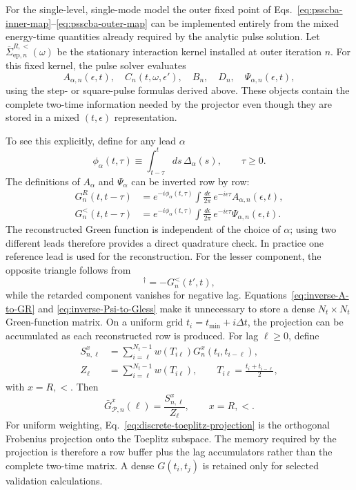 \documentclass[
 reprint,
 superscriptaddress,
 amsmath,amssymb,
 aps,prb,
 longbibliography,
 floatfix
]{revtex4-2}
\newcommand{\ep}{\mathrm{ep}}
\newcommand{\barSigma}{\overline{\Sigma}}
\begin{document}
For the single-level, single-mode model the outer fixed point of Eqs.~\eqref{eq:psscba-inner-map}--\eqref{eq:psscba-outer-map} can be implemented entirely from the mixed energy-time quantities already required by the analytic pulse solution. Let
\(\barSigma_{\ep,n}^{R,<}(\omega)\)
be the stationary interaction kernel installed at outer iteration \(n\). For this fixed kernel, the pulse solver evaluates
\begin{equation*}
A_{\alpha,n}(\epsilon,t),
\quad
C_n(t,\omega,\epsilon'),
\quad
B_n,
\quad
D_n,
\quad
\Psi_{\alpha,n}(\epsilon,t),
\end{equation*}
using the step- or square-pulse formulas derived above. These objects contain the complete two-time information needed by the projector even though they are stored in a mixed \((t,\epsilon)\) representation.

To see this explicitly, define for any lead \(\alpha\)
\begin{equation*}
\phi_\alpha(t,\tau)
\equiv
\int_{t-\tau}^{t}ds\,\Delta_\alpha(s),
\qquad \tau\ge0.
\end{equation*}
The definitions of \(A_\alpha\) and \(\Psi_\alpha\) can be inverted row by row:
\begin{align}
G_n^R(t,t-\tau)
&=
e^{-i\phi_\alpha(t,\tau)}
\int\frac{d\epsilon}{2\pi}\,
e^{-i\epsilon\tau}
A_{\alpha,n}(\epsilon,t),
\label{eq:inverse-A-to-GR}
\\
G_n^<(t,t-\tau)
&=
e^{-i\phi_\alpha(t,\tau)}
\int\frac{d\epsilon}{2\pi}\,
e^{-i\epsilon\tau}
\Psi_{\alpha,n}(\epsilon,t).
\label{eq:inverse-Psi-to-Gless}
\end{align}
The reconstructed Green function is independent of the choice of \(\alpha\); using two different leads therefore provides a direct quadrature check. In practice one reference lead is used for the reconstruction. For the lesser component, the opposite triangle follows from
\begin{equation*}
[G_n^<(t,t')]^\dagger=-G_n^<(t',t),
\end{equation*}
while the retarded component vanishes for negative lag. Equations~\eqref{eq:inverse-A-to-GR} and \eqref{eq:inverse-Psi-to-Gless} make it unnecessary to store a dense \(N_t\times N_t\) Green-function matrix. On a uniform grid \(t_i=t_{\min}+i\Delta t\), the projection can be accumulated as each reconstructed row is produced. For lag \(\ell\ge0\), define
\begin{align}
S_{n,\ell}^{x}
&=
\sum_{i=\ell}^{N_t-1}
w(T_{i\ell})
G_n^x(t_i,t_{i-\ell}),
\\
Z_\ell
&=
\sum_{i=\ell}^{N_t-1}w(T_{i\ell}),
\qquad
T_{i\ell}=\frac{t_i+t_{i-\ell}}{2},
\end{align}
with \(x=R,<\). Then
\begin{equation}
\bar G_{\mathcal P,n}^{x}(\ell)
=
\frac{S_{n,\ell}^{x}}{Z_\ell},
\qquad x=R,<.
\label{eq:discrete-toeplitz-projection}
\end{equation}
For uniform weighting, Eq.~\eqref{eq:discrete-toeplitz-projection} is the orthogonal Frobenius projection onto the Toeplitz subspace. The memory required by the projection is therefore a row buffer plus the lag accumulators rather than the complete two-time matrix. A dense \(G(t_i,t_j)\) is retained only for selected validation calculations.
\end{document}
